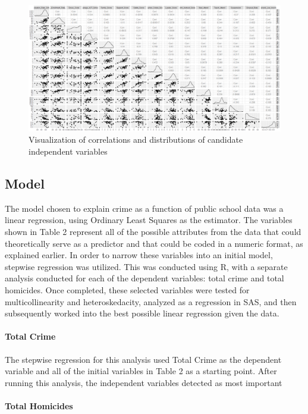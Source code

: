 \documentclass[12pt]{article}
\begin{document}
	\begin{figure}
		\includegraphics[scale=.33]{pairplot.png}
		\caption{Visualization of correlations and distributions of candidate independent variables}
	\end{figure}

\subsection{Model}

The model chosen to explain crime as a function of public school data was a linear regression, using Ordinary Least Squares as the estimator.  The variables shown in Table 2 represent all of the possible attributes from the data that could theoretically serve as a predictor and that could be coded in a numeric format, as explained earlier.  In order to narrow these variables into an initial model, stepwise regression was utilized.  This was conducted using R, with a separate analysis conducted for each of the dependent variables:  total crime and total homicides.  Once completed, these selected variables were tested for multicollinearity and heteroskedacity, analyzed as a regression in SAS, and then subsequently worked into the best possible linear regression given the data.

\paragraph{Total Crime}

The stepwise regression for this analysis used Total Crime as the dependent variable and all of the initial variables in Table 2 as a starting point.  After running this analysis, the independent variables detected as most important



\paragraph{Total Homicides}
\end{document}
